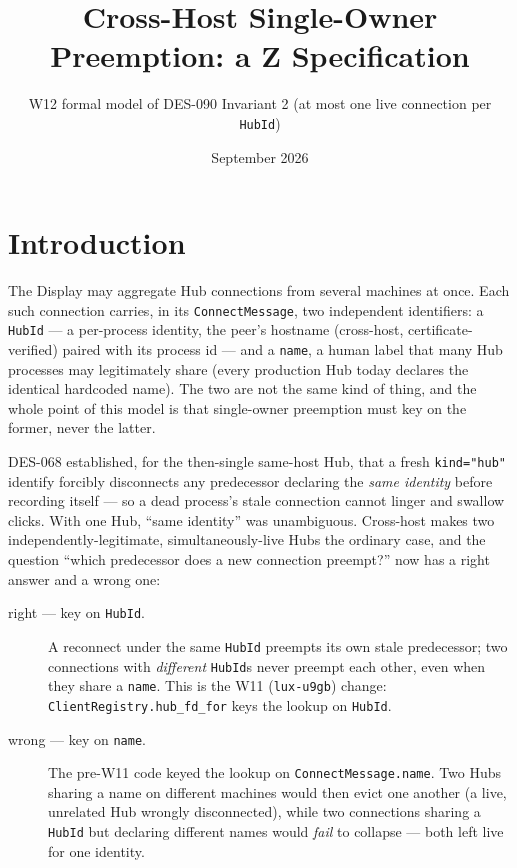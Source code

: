 \documentclass[a4paper,10pt,fleqn]{article}
\begin{document}
\title{Cross-Host Single-Owner Preemption: a Z Specification}
\author{W12 formal model of DES-090 Invariant 2 (at most one live
connection per \texttt{HubId})}
\date{September 2026}
\maketitle

\section{Introduction}

The Display may aggregate Hub connections from several machines at once.
Each such connection carries, in its \texttt{ConnectMessage}, two
independent identifiers: a \texttt{HubId} --- a per-process identity, the
peer's hostname (cross-host, certificate-verified) paired with its
process id --- and a \texttt{name}, a human label that many Hub processes
may legitimately share (every production Hub today declares the identical
hardcoded name).  The two are not the same kind of thing, and the whole
point of this model is that single-owner preemption must key on the
former, never the latter.

DES-068 established, for the then-single same-host Hub, that a fresh
\texttt{kind="hub"} identify forcibly disconnects any predecessor
declaring the \emph{same identity} before recording itself --- so a dead
process's stale connection cannot linger and swallow clicks.  With one
Hub, ``same identity'' was unambiguous.  Cross-host makes two
independently-legitimate, simultaneously-live Hubs the ordinary case, and
the question ``which predecessor does a new connection preempt?'' now has
a right answer and a wrong one:

\begin{description}
  \item[right --- key on \texttt{HubId}.] A reconnect under the same
    \texttt{HubId} preempts its own stale predecessor; two connections
    with \emph{different} \texttt{HubId}s never preempt each other, even
    when they share a \texttt{name}.  This is the W11 (\texttt{lux-u9gb})
    change: \texttt{ClientRegistry.hub\_fd\_for} keys the lookup on
    \texttt{HubId}.
  \item[wrong --- key on \texttt{name}.] The pre-W11 code keyed the
    lookup on \texttt{ConnectMessage.name}.  Two Hubs sharing a name on
    different machines would then evict one another (a live, unrelated
    Hub wrongly disconnected), while two connections sharing a
    \texttt{HubId} but declaring different names would \emph{fail} to
    collapse --- both left live for one identity.
\end{description}
\end{document}
